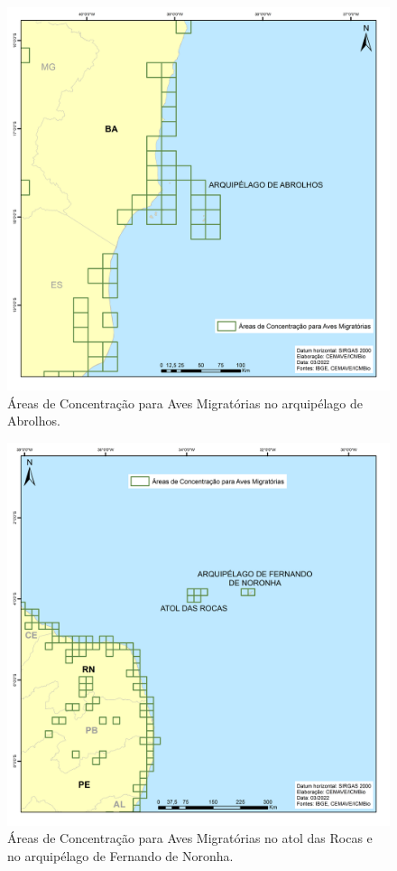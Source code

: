 \documentclass[
  oneside]{scrbook}
\begin{document}
\begin{figure}[H]

{\centering \includegraphics[width=0.75\linewidth]{imagens/cap07/Figura_7.38_Abrolhos} 

}

\caption{Áreas de Concentração para Aves Migratórias no arquipélago de Abrolhos.}\label{fig:58}
\end{figure}

\begin{figure}[H]

{\centering \includegraphics[width=0.75\linewidth]{imagens/cap07/Figura_7.39_Rocas_Noronha} 

}

\caption{Áreas de Concentração para Aves Migratórias no atol das Rocas e no arquipélago de Fernando de Noronha.}\label{fig:59}
\end{figure}
\end{document}
